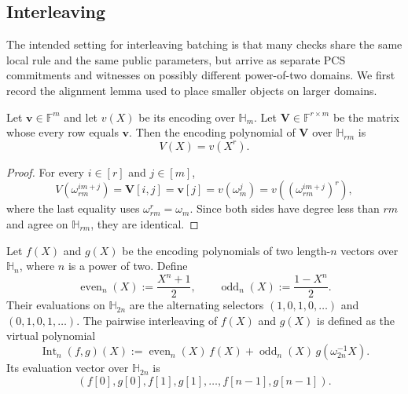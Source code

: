 \subsection{Interleaving}

The intended setting for interleaving batching is that many checks share the
same local rule and the same public parameters, but arrive as separate
PCS commitments and witnesses on possibly different power-of-two domains.
We first record the alignment lemma
used to place smaller objects on larger domains.

\begin{lemma}
\label{lem:row-replication}
Let $\mathbf{v}\in\mathbb{F}^m$ and let $v(X)$ be its encoding over
$\mathbb{H}_m$. Let $\mathbf{V}\in\mathbb{F}^{r\times m}$ be the matrix whose
every row equals $\mathbf{v}$. Then the encoding polynomial of $\mathbf{V}$ over
$\mathbb{H}_{rm}$ is
\[
V(X)=v(X^r).
\]
\end{lemma}

\begin{proof}
For every $i\in[r]$ and $j\in[m]$,
\[
V(\omega_{rm}^{im+j})
= \mathbf{V}[i,j]
= \mathbf{v}[j]
= v(\omega_m^j)
= v((\omega_{rm}^{im+j})^r),
\]
where the last equality uses $\omega_{rm}^r=\omega_m$. Since both sides have
degree less than $rm$ and agree on $\mathbb{H}_{rm}$, they are identical.
\end{proof}

\begin{definition}
\label{def:pairwise-interleaving}
Let $f(X)$ and $g(X)$ be the encoding polynomials of two length-$n$ vectors
over $\mathbb{H}_n$, where $n$ is a power of two. Define
\[
\operatorname{even}_n(X):=\frac{X^n+1}{2},
\qquad
\operatorname{odd}_n(X):=\frac{1-X^n}{2}.
\]
Their evaluations on $\mathbb{H}_{2n}$ are the alternating selectors
$(1,0,1,0,\ldots)$ and $(0,1,0,1,\ldots)$. The pairwise interleaving of
$f(X)$ and $g(X)$ is defined as the virtual polynomial
\[
\operatorname{Int}_n(f,g)(X)
:=
\operatorname{even}_n(X)\,f(X)
+
\operatorname{odd}_n(X)\,g(\omega_{2n}^{-1}X).
\]
Its evaluation vector over $\mathbb{H}_{2n}$ is
\[
(f[0],g[0],f[1],g[1],\ldots,f[n-1],g[n-1]).
\]
\end{definition}

